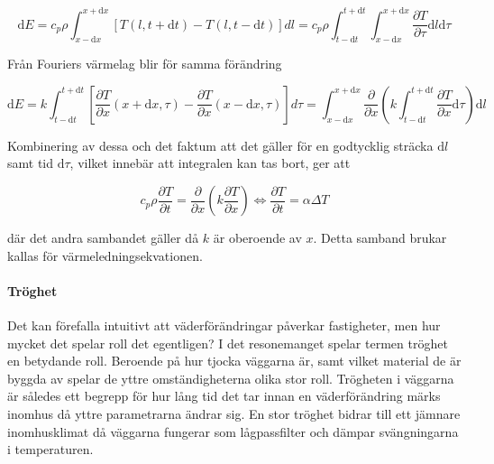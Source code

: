 \begin{equation}
\mathrm{d}E = c_p \rho \int_{x-\mathrm{d}x}^{x+\mathrm{d}x} \left[ T\left( l, t+\mathrm{d}t\right) - T\left( l, t-\mathrm{d}t\right)\right]dl = c_p \rho \int_{t-\mathrm{d}t}^{t+\mathrm{d}t} \int_{x-\mathrm{d}x}^{x+\mathrm{d}x} \frac{\partial T}{\partial \tau} \mathrm{d}l\mathrm{d}\tau
\end{equation}

Från Fouriers värmelag blir för samma förändring

\begin{equation}
\mathrm{d}E = k\int_{t-\mathrm{d}t}^{t+\mathrm{d}t} \left[ \frac{\partial T}{\partial x}\left( x + \mathrm{d}x, \tau \right) - \frac{\partial T}{\partial x}\left( x-\mathrm{d}x, \tau \right)\right]d\tau =  \int_{x-\mathrm{d}x}^{x+\mathrm{d}x} \frac{\partial}{\partial x} \left( k \int_{t-\mathrm{d}t}^{t+\mathrm{d}t} \frac{\partial T}{\partial x} \mathrm{d}\tau \right)\mathrm{d}l
\end{equation}

Kombinering av dessa och det faktum att det gäller för en godtycklig sträcka $\mathrm{d}l$ samt tid $\mathrm{d}\tau$, vilket innebär att integralen kan tas bort, ger att

\begin{equation}\label{eq:conduction:heateq}\boxed{ \; \; \;
c_p \rho \frac{\partial T}{\partial t} = \frac{\partial}{\partial x} \left( k \frac{\partial T}{\partial x} \right) \Leftrightarrow \frac{\partial T}{\partial t} = \alpha \Delta T
\; \; \; }
\end{equation}

där det andra sambandet gäller då $k$ är oberoende av $x$. Detta samband brukar kallas för värmeledningsekvationen.

\paragraph{Tröghet}
Det kan förefalla intuitivt att väderförändringar påverkar fastigheter, men hur mycket det spelar roll det egentligen? I det resonemanget spelar termen tröghet en betydande roll. Beroende på hur tjocka väggarna är, samt vilket material de är byggda av spelar de yttre omständigheterna olika stor roll. Trögheten i väggarna är således ett begrepp för hur lång tid det tar innan en väderförändring märks inomhus då yttre parametrarna ändrar sig. En stor tröghet bidrar till ett jämnare inomhusklimat då väggarna fungerar som lågpassfilter och dämpar svängningarna i temperaturen.
